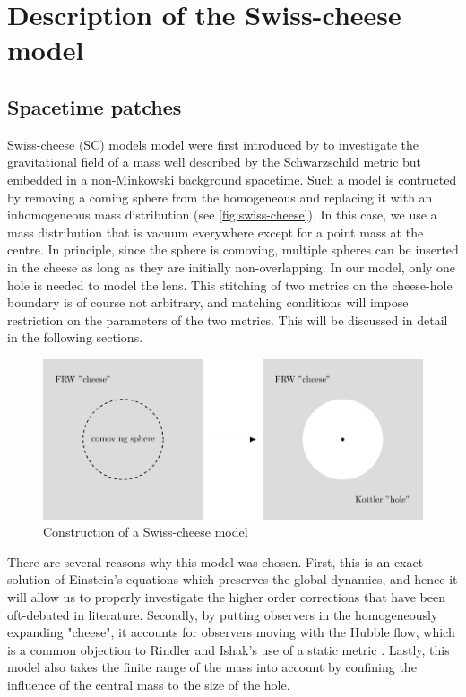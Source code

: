 \chapter{Description of the Swiss-cheese model}
\label{chapter:swiss-cheese}

\section{Spacetime patches}

Swiss-cheese (SC) models model were first introduced by \citet{einstein1945influence} to investigate the gravitational field of a mass well described by the Schwarzschild metric but embedded in a non-Minkowski background spacetime. Such a model is contructed by removing a coming sphere from the homogeneous and replacing it with an inhomogeneous mass distribution (see \autoref{fig:swiss-cheese}). In this case, we use a mass distribution that is vacuum everywhere except for a point mass at the centre. In principle, since the sphere is comoving, multiple spheres can be inserted in the cheese as long as they are initially non-overlapping. In our model, only one hole is needed to model the lens. This stitching of two metrics on the cheese-hole boundary is of course not arbitrary, and matching conditions will impose restriction on the parameters of the two metrics. This will be discussed in detail in the following sections. 

\begin{figure}
  \centering
  \includegraphics[height=0.3\linewidth]{images/swiss-cheese.pdf}
  \caption{Construction of a Swiss-cheese model}
  \label{fig:swiss-cheese}
\end{figure}

There are several reasons why this model was chosen. First, this is an exact solution of Einstein's equations which preserves the global dynamics, and hence it will allow us to properly investigate the higher order corrections that have been oft-debated in literature. Secondly, by putting observers in the homogeneously expanding "cheese", it accounts for observers moving with the Hubble flow, which is a common objection to Rindler and Ishak's use of a static metric \citep{park2008rigorous,khriplovich2008does,simpson2010lensing,butcher2016no}. Lastly, this model also takes the finite range of the mass into account by confining the influence of the central mass to the size of the hole. 


